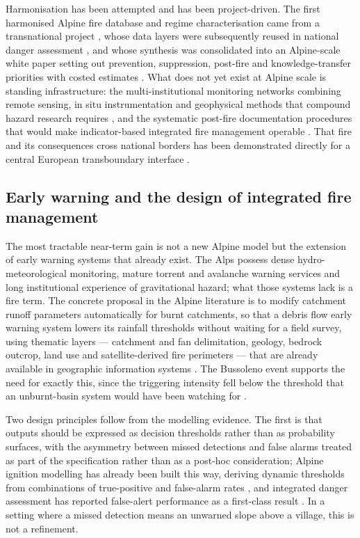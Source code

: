 \documentclass[11pt,a4paper]{article}
\begin{document}
Harmonisation has been attempted and has been project-driven. The first harmonised Alpine fire database and regime characterisation came from a transnational project \citep{valese_wildfires_2011}, whose data layers were subsequently reused in national danger assessment \citep{muller_towards_2020}, and whose synthesis was consolidated into an Alpine-scale white paper setting out prevention, suppression, post-fire and knowledge-transfer priorities with costed estimates \citep{muller_forest_2020}. What does not yet exist at Alpine scale is standing infrastructure: the multi-institutional monitoring networks combining remote sensing, in situ instrumentation and geophysical methods that compound hazard research requires \citep{baselt_compound_2026}, and the systematic post-fire documentation procedures that would make indicator-based integrated fire management operable \citep{melzner_wildfire-induced_2025}. That fire and its consequences cross national borders has been demonstrated directly for a central European transboundary interface \citep{avouris_exposure_2025}.

\subsection{Early warning and the design of integrated fire management}

The most tractable near-term gain is not a new Alpine model but the extension of early warning systems that already exist. The Alps possess dense hydro-meteorological monitoring, mature torrent and avalanche warning services and long institutional experience of gravitational hazard; what those systems lack is a fire term. The concrete proposal in the Alpine literature is to modify catchment runoff parameters automatically for burnt catchments, so that a debris flow early warning system lowers its rainfall thresholds without waiting for a field survey, using thematic layers --- catchment and fan delimitation, geology, bedrock outcrop, land use and satellite-derived fire perimeters --- that are already available in geographic information systems \citep{tiranti_wildfires_2021}. The Bussoleno event supports the need for exactly this, since the triggering intensity fell below the threshold that an unburnt-basin system would have been watching for \citep{laporta_postwildfire_2025}.

Two design principles follow from the modelling evidence. The first is that outputs should be expressed as decision thresholds rather than as probability surfaces, with the asymmetry between missed detections and false alarms treated as part of the specification rather than as a post-hoc consideration; Alpine ignition modelling has already been built this way, deriving dynamic thresholds from combinations of true-positive and false-alarm rates \citep{moreno_1_nodate}, and integrated danger assessment has reported false-alert performance as a first-class result \citep{muller_towards_2020}. In a setting where a missed detection means an unwarned slope above a village, this is not a refinement.
\end{document}
